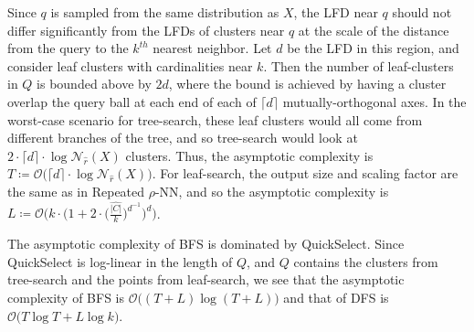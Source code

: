 
Since $q$ is sampled from the same distribution as $X$, the LFD near $q$ should not differ significantly from the LFDs of clusters near $q$ at the scale of the distance from the query to the $k^{th}$ nearest neighbor.
Let $d$ be the LFD in this region, and consider leaf clusters with cardinalities near $k$.
Then the number of leaf-clusters in $Q$ is bounded above by $2d$, where the bound is achieved by having a cluster overlap the query ball at each end of each of $\lceil d \rceil$ mutually-orthogonal axes.
In the worst-case scenario for tree-search, these leaf clusters would all come from different branches of the tree, and so tree-search would look at $2 \cdot \lceil d \rceil \cdot \log \mathcal{N}_{\hat{r}}(X)$ clusters.
Thus, the asymptotic complexity is $T \coloneqq \mathcal{O} \big( \lceil d \rceil \cdot \log \mathcal{N}_{\hat{r}}(X) \big)$.
For leaf-search, the output size and scaling factor are the same as in Repeated $\rho$-NN, and so the asymptotic complexity is $L \coloneqq \mathcal{O} \Big( k \cdot \Big( 1 + 2 \cdot \big( \frac{\hat{|C|}}{k} \big) ^ {d^{-1}} \Big)^d \Big)$.

The asymptotic complexity of BFS is dominated by QuickSelect.
Since QuickSelect is log-linear in the length of $Q$, and $Q$ contains the clusters from tree-search and the points from leaf-search, we see that the asymptotic complexity of BFS is $\mathcal{O} \big( (T + L ) \log (T + L ) \big)$ and that of DFS is $\mathcal{O} \big( T \log T + L \log k \big)$.

